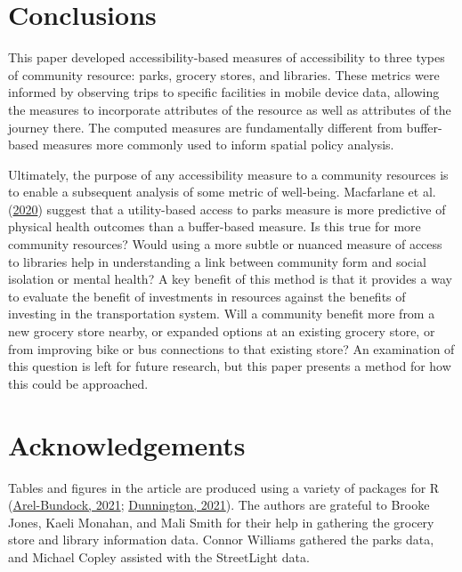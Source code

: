 \documentclass[review, 3p]{elsarticle} %
\begin{document}
\hypertarget{conclusions}{%
\section{Conclusions}\label{conclusions}}

This paper developed accessibility-based measures of accessibility to three
types of community resource: parks, grocery stores, and libraries. These metrics
were informed by observing trips to specific facilities in mobile
device data, allowing the measures to incorporate attributes of the resource
as well as attributes of the journey there. The computed measures are
fundamentally different from buffer-based measures more commonly used to
inform spatial policy analysis.

Ultimately, the purpose of any accessibility measure to a community resources
is to enable a subsequent analysis of some metric of well-being. Macfarlane et al. (\protect\hyperlink{ref-macfarlane2020}{2020})
suggest that a utility-based access to parks measure is more predictive of
physical health outcomes than a buffer-based measure. Is this true for more
community resources? Would using a more subtle or nuanced measure of access to
libraries help in understanding a link between community form and social isolation
or mental health? A key benefit of this method is that it provides a way to
evaluate the benefit of investments in resources against the benefits of investing
in the transportation system. Will a community benefit more from a new grocery store
nearby, or expanded options at an existing grocery store, or from improving bike
or bus connections to that existing store? An examination of this question is
left for future research, but this paper presents a method for how this could be
approached.

\hypertarget{acknowledgements}{%
\section*{Acknowledgements}\label{acknowledgements}}

Tables and figures in the article are produced using a variety of packages for R (\protect\hyperlink{ref-modelsummary}{Arel-Bundock, 2021}; \protect\hyperlink{ref-ggspatial}{Dunnington, 2021}).
The authors are grateful to Brooke Jones, Kaeli Monahan, and Mali Smith for their help in gathering the grocery store and library information data. Connor Williams gathered the parks data, and Michael Copley assisted with the StreetLight data.
\end{document}
